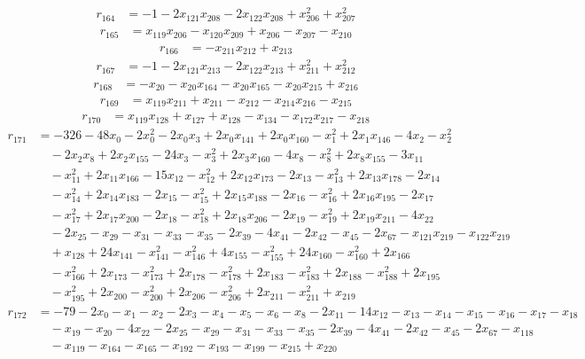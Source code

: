 \begin{align*}
r_{164}&=
-1-2x_{121}x_{208}-2x_{122}x_{208}+x_{206}^{2}+x_{207}^{2}
\end{align*}
\begin{align*}
r_{165}&=
x_{119}x_{206}-x_{120}x_{209}+x_{206}-x_{207}-x_{210}
\end{align*}
\begin{align*}
r_{166}&=
-x_{211}x_{212}+x_{213}
\end{align*}
\begin{align*}
r_{167}&=
-1-2x_{121}x_{213}-2x_{122}x_{213}+x_{211}^{2}+x_{212}^{2}
\end{align*}
\begin{align*}
r_{168}&=
-x_{20}-x_{20}x_{164}-x_{20}x_{165}-x_{20}x_{215}+x_{216}
\end{align*}
\begin{align*}
r_{169}&=
x_{119}x_{211}+x_{211}-x_{212}-x_{214}x_{216}-x_{215}
\end{align*}
\begin{align*}
r_{170}&=
x_{119}x_{128}+x_{127}+x_{128}-x_{134}-x_{172}x_{217}-x_{218}
\end{align*}
\begin{align*}
r_{171}&=
-326-48x_{0}-2x_{0}^{2}-2x_{0}x_{3}+2x_{0}x_{141}+2x_{0}x_{160}-x_{1}^{2}+2x_{1}x_{146}-4x_{2}-x_{2}^{2} \\
&\quad -2x_{2}x_{8}+2x_{2}x_{155}-24x_{3}-x_{3}^{2}+2x_{3}x_{160}-4x_{8}-x_{8}^{2}+2x_{8}x_{155}-3x_{11} \\
&\quad -x_{11}^{2}+2x_{11}x_{166}-15x_{12}-x_{12}^{2}+2x_{12}x_{173}-2x_{13}-x_{13}^{2}+2x_{13}x_{178}-2x_{14} \\
&\quad -x_{14}^{2}+2x_{14}x_{183}-2x_{15}-x_{15}^{2}+2x_{15}x_{188}-2x_{16}-x_{16}^{2}+2x_{16}x_{195}-2x_{17} \\
&\quad -x_{17}^{2}+2x_{17}x_{200}-2x_{18}-x_{18}^{2}+2x_{18}x_{206}-2x_{19}-x_{19}^{2}+2x_{19}x_{211}-4x_{22} \\
&\quad -2x_{25}-x_{29}-x_{31}-x_{33}-x_{35}-2x_{39}-4x_{41}-2x_{42}-x_{45}-2x_{67}-x_{121}x_{219}-x_{122}x_{219} \\
&\quad +x_{128}+24x_{141}-x_{141}^{2}-x_{146}^{2}+4x_{155}-x_{155}^{2}+24x_{160}-x_{160}^{2}+2x_{166} \\
&\quad -x_{166}^{2}+2x_{173}-x_{173}^{2}+2x_{178}-x_{178}^{2}+2x_{183}-x_{183}^{2}+2x_{188}-x_{188}^{2}+2x_{195} \\
&\quad -x_{195}^{2}+2x_{200}-x_{200}^{2}+2x_{206}-x_{206}^{2}+2x_{211}-x_{211}^{2}+x_{219}
\end{align*}
\begin{align*}
r_{172}&=
-79-2x_{0}-x_{1}-x_{2}-2x_{3}-x_{4}-x_{5}-x_{6}-x_{8}-2x_{11}-14x_{12}-x_{13}-x_{14}-x_{15}-x_{16}-x_{17}-x_{18} \\
&\quad -x_{19}-x_{20}-4x_{22}-2x_{25}-x_{29}-x_{31}-x_{33}-x_{35}-2x_{39}-4x_{41}-2x_{42}-x_{45}-2x_{67}-x_{118} \\
&\quad -x_{119}-x_{164}-x_{165}-x_{192}-x_{193}-x_{199}-x_{215}+x_{220}
\end{align*}
